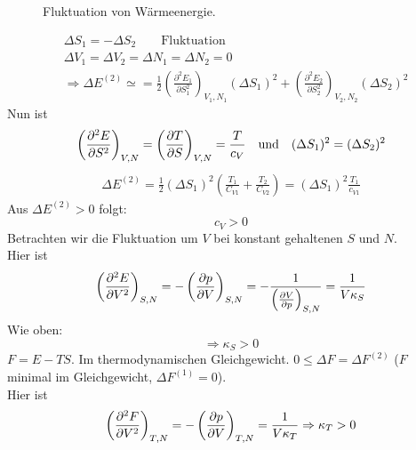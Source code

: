 \begin{figure}[H]
        \centering
        \def\svgwidth{0.35\textwidth}
        
        \caption{Fluktuation von Wärmeenergie.}
        \label{img:FluctuationOfHeat}
\end{figure}

\begin{equation}
    \begin{split}
        & \Delta S_1 = - \Delta S_2 \qquad \text{Fluktuation} \\
        & \Delta V_1 = \Delta V_2 = \Delta N_1 = \Delta N_2 = 0 \\
        & \Rightarrow \Delta E^{(2)} \simeq = \frac{1}{2} \left( \frac{\partial^2 E_1}{\partial S_1^2} \right)_{V_1, N_1} (\Delta S_1)^2 +  
        \left( \frac{\partial^2 E_2}{\partial S_2^2} \right)_{V_2, N_2} (\Delta S_2)^2 
    \end{split}
\end{equation}
Nun ist
\begin{equation}
    \left( \frac{\partial^2 E}{\partial S^2} \right)_{V, N} = \left( \frac{\partial T}{\partial S} \right)_{V, N} = \frac{T}{c_V}  \quad \text{und} \quad
    (\Delta S_1)^2 = (\Delta S_2)^2
\end{equation}
\begin{equation}
    \begin{split}
        \Delta E^{(2)} = \frac{1}{2} (\Delta S_1)^2 \left( \frac{T_1}{C_{V1}} + \frac{T_2}{C_{V2}} \right) = (\Delta S_1)^2 \frac{T_1}{c_{V1}}
    \end{split}
\end{equation}
Aus $\Delta E^{(2)} > 0$ folgt:
\begin{equation}
    c_V > 0
\end{equation} 
Betrachten wir die Fluktuation um $V$ bei konstant gehaltenen $S$ und $N$. \\
Hier ist
\begin{equation}
    \left( \frac{\partial^2 E}{\partial V^2} \right)_{S, N} = - \left( \frac{\partial p}{\partial V} \right)_{S, N} = - \frac{1}{\left( \frac{\partial V}{\partial p} \right)_{S, N}} = \frac{1}{V \kappa_S}
\end{equation}
Wie oben:
\begin{equation}
    \Rightarrow \kappa_S > 0
\end{equation}
$F = E - TS$. Im thermodynamischen Gleichgewicht. $0 \leq \Delta F = \Delta F^{(2)}$ ($F$ minimal im Gleichgewicht, $\Delta F^{(1)} = 0$). \\
Hier ist
\begin{equation}
    \left( \frac{\partial^2 F}{\partial V^2} \right)_{T, N} = - \left( \frac{\partial p}{\partial V} \right)_{T, N} = \frac{1}{V \kappa_T} \Rightarrow \kappa_T > 0
\end{equation}
